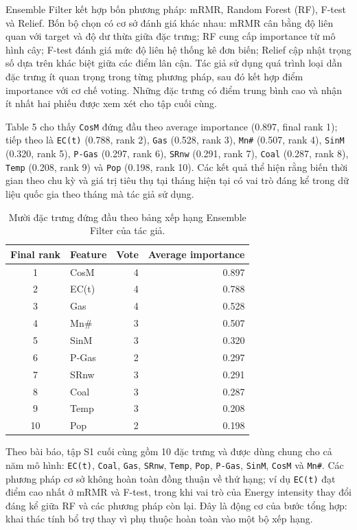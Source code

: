 Ensemble Filter kết hợp bốn phương pháp: mRMR, Random Forest (RF), F-test và Relief. Bốn bộ chọn có cơ sở đánh giá khác nhau: mRMR cân bằng độ liên quan với target và độ dư thừa giữa đặc trưng; RF cung cấp importance từ mô hình cây; F-test đánh giá mức độ liên hệ thống kê đơn biến; Relief cập nhật trọng số dựa trên khác biệt giữa các điểm lân cận. Tác giả sử dụng quá trình loại dần đặc trưng ít quan trọng trong từng phương pháp, sau đó kết hợp điểm importance với cơ chế voting. Những đặc trưng có điểm trung bình cao và nhận ít nhất hai phiếu được xem xét cho tập cuối cùng.

Table 5 cho thấy \texttt{CosM} đứng đầu theo average importance (0.897, final rank 1); tiếp theo là \texttt{EC(t)} (0.788, rank 2), \texttt{Gas} (0.528, rank 3), \texttt{Mn\#} (0.507, rank 4), \texttt{SinM} (0.320, rank 5), \texttt{P-Gas} (0.297, rank 6), \texttt{SRnw} (0.291, rank 7), \texttt{Coal} (0.287, rank 8), \texttt{Temp} (0.208, rank 9) và \texttt{Pop} (0.198, rank 10). Các kết quả thể hiện rằng biến thời gian theo chu kỳ và giá trị tiêu thụ tại tháng hiện tại có vai trò đáng kể trong dữ liệu quốc gia theo tháng mà tác giả sử dụng.

\begin{table}[H]
\centering
\small
\caption{Mười đặc trưng đứng đầu theo bảng xếp hạng Ensemble Filter của tác giả.}
\label{tab:authors-ensemble-top10}
\begin{tabular}{clrr}
\toprule
\textbf{Final rank} & \textbf{Feature} & \textbf{Vote} & \textbf{Average importance} \\
\midrule
1 & CosM & 4 & 0.897 \\
2 & EC(t) & 4 & 0.788 \\
3 & Gas & 4 & 0.528 \\
4 & Mn\# & 3 & 0.507 \\
5 & SinM & 3 & 0.320 \\
6 & P-Gas & 2 & 0.297 \\
7 & SRnw & 3 & 0.291 \\
8 & Coal & 3 & 0.287 \\
9 & Temp & 3 & 0.208 \\
10 & Pop & 2 & 0.198 \\
\bottomrule
\end{tabular}
\end{table}

Theo bài báo, tập S1 cuối cùng gồm 10 đặc trưng và được dùng chung cho cả năm mô hình: \texttt{EC(t)}, \texttt{Coal}, \texttt{Gas}, \texttt{SRnw}, \texttt{Temp}, \texttt{Pop}, \texttt{P-Gas}, \texttt{SinM}, \texttt{CosM} và \texttt{Mn\#}. Các phương pháp cơ sở không hoàn toàn đồng thuận về thứ hạng; ví dụ \texttt{EC(t)} đạt điểm cao nhất ở mRMR và F-test, trong khi vai trò của Energy intensity thay đổi đáng kể giữa RF và các phương pháp còn lại. Đây là động cơ của bước tổng hợp: khai thác tính bổ trợ thay vì phụ thuộc hoàn toàn vào một bộ xếp hạng.

